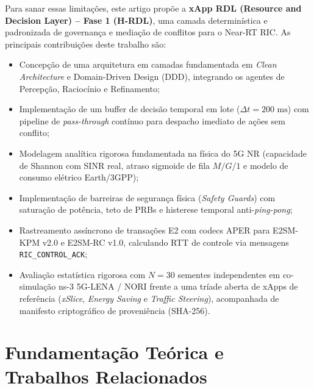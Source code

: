 \documentclass[12pt]{article}
\begin{document}
Para sanar essas limitações, este artigo propõe a \textbf{xApp RDL (Resource and Decision Layer) -- Fase 1 (H-RDL)}, uma camada determinística e padronizada de governança e mediação de conflitos para o Near-RT RIC. As principais contribuições deste trabalho são:
\begin{itemize}
    \item Concepção de uma arquitetura em camadas fundamentada em \textit{Clean Architecture} e Domain-Driven Design (DDD), integrando os agentes de Percepção, Raciocínio e Refinamento;
    \item Implementação de um buffer de decisão temporal em lote ($\Delta t = 200\text{ ms}$) com pipeline de \textit{pass-through} contínuo para despacho imediato de ações sem conflito;
    \item Modelagem analítica rigorosa fundamentada na física do 5G NR (capacidade de Shannon com SINR real, atraso sigmoide de fila $M/G/1$ e modelo de consumo elétrico Earth/3GPP);
    \item Implementação de barreiras de segurança física (\textit{Safety Guards}) com saturação de potência, teto de PRBs e histerese temporal anti-\textit{ping-pong};
    \item Rastreamento assíncrono de transações E2 com codecs APER para E2SM-KPM v2.0 e E2SM-RC v1.0, calculando RTT de controle via mensagens \texttt{RIC\_CONTROL\_ACK};
    \item Avaliação estatística rigorosa com $N = 30$ sementes independentes em co-simulação ns-3 5G-LENA / NORI frente a uma tríade aberta de xApps de referência (\textit{xSlice}, \textit{Energy Saving} e \textit{Traffic Steering}), acompanhada de manifesto criptográfico de proveniência (SHA-256).
\end{itemize}

\section{Fundamentação Teórica e Trabalhos Relacionados}
\end{document}

